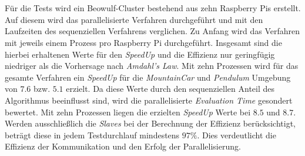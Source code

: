 \\\\
Für die Tests wird ein Beowulf-Cluster bestehend aus zehn Raspberry Pis erstellt. Auf diesem wird das parallelisierte Verfahren durchgeführt und mit den Laufzeiten des sequenziellen Verfahrens verglichen. Zu Anfang wird das Verfahren mit jeweils einem Prozess pro Raspberry Pi durchgeführt. Insgesamt sind die hierbei erhaltenen Werte für den \emph{SpeedUp} und die Effizienz nur geringfügig niedriger als die Vorhersage nach \emph{Amdahl's Law}. Mit zehn Prozessen wird für das gesamte Verfahren ein \emph{SpeedUp} für die \emph{MountainCar} und \emph{Pendulum} Umgebung von $7.6$ bzw. $5.1$ erzielt. Da diese Werte durch den sequenziellen Anteil des Algorithmus beeinflusst sind, wird die parallelisierte \emph{Evaluation Time} gesondert bewertet. Mit zehn Prozessen liegen die erzielten \emph{SpeedUp} Werte bei $8.5$ und $8.7$. Werden ausschließlich die \emph{Slaves} bei der Berechnung der Effizienz berücksichtigt, beträgt diese in jedem Testdurchlauf mindestens $97\%$. Dies verdeutlicht die Effizienz der Kommunikation und den Erfolg der Parallelisierung.
\\\\
